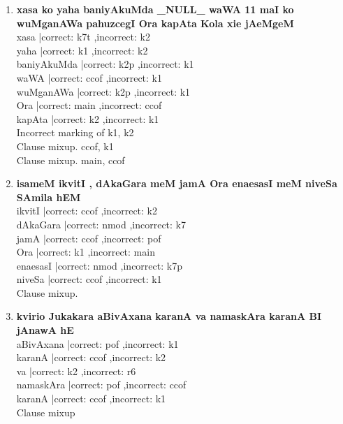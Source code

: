 \documentclass[a4 paper]{article}
\begin{document}
\begin{enumerate}
    \item \textbf{xasa ko yaha baniyAkuMda \_NULL\_ waWA 11 maI ko wuMganAWa pahuzcegI Ora kapAta Kola xie jAeMgeM}\\
        xasa |correct: k7t ,incorrect: k2       \\
        yaha |correct: k1 ,incorrect: k2        \\
        baniyAkuMda |correct: k2p ,incorrect: k1        \\
        waWA |correct: ccof ,incorrect: k1      \\
        wuMganAWa |correct: k2p ,incorrect: k1      \\
        Ora |correct: main ,incorrect: ccof         \\
        kapAta |correct: k2 ,incorrect: k1      \\
        \addlinespace[1em]
        Incorrect marking of k1, k2\\
        Clause mixup. ccof, k1\\
        Clause mixup. main, ccof\\

    \item \textbf{isameM ikvitI , dAkaGara meM jamA Ora enaesasI meM niveSa SAmila hEM}\\
        ikvitI |correct: ccof ,incorrect: k2        \\
        dAkaGara |correct: nmod ,incorrect: k7      \\
        jamA |correct: ccof ,incorrect: pof         \\
        Ora |correct: k1 ,incorrect: main       \\
        enaesasI |correct: nmod ,incorrect: k7p         \\
        niveSa |correct: ccof ,incorrect: k1        \\
        \addlinespace[1em]
        Clause mixup.\\

    \item \textbf{kvirio Jukakara aBivAxana karanA va namaskAra karanA BI jAnawA hE}\\
        aBivAxana |correct: pof ,incorrect: k1      \\
        karanA |correct: ccof ,incorrect: k2        \\
        va |correct: k2 ,incorrect: r6      \\
        namaskAra |correct: pof ,incorrect: ccof        \\
        karanA |correct: ccof ,incorrect: k1        \\
        \addlinespace[1em]
        Clause mixup\\


\end{enumerate}
\end{document}
